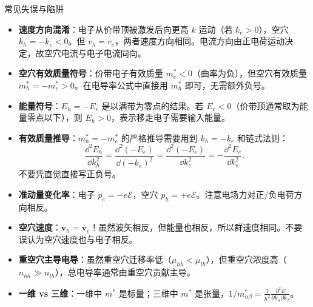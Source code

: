 \begin{errorbox}{常见失误与陷阱}
\begin{itemize}
    \item \textbf{速度方向混淆}：电子从价带顶被激发后向更高 $k$ 运动（若 $k_e>0$），空穴 $k_h=-k_e<0$。但 $v_h=v_e$，两者速度方向相同。电流方向由正电荷运动决定，故空穴电流与电子电流同向。
    \item \textbf{空穴有效质量符号}：价带电子有效质量 $m_e^*<0$（曲率为负），但空穴有效质量 $m_h^*=-m_e^*>0$。在电导率公式中直接用 $m_h^*$ 即可，无需额外负号。
    \item \textbf{能量符号}：$E_h=-E_e$ 是以满带为零点的结果。若 $E_e<0$（价带顶通常取为能量零点以下），则 $E_h>0$，表示移走电子需要输入能量。
    \item \textbf{有效质量推导}：$m_h^*=-m_e^*$ 的严格推导需要用到 $k_h=-k_e$ 和链式法则：
    \[
    \frac{\dd^2E_h}{\dd k_h^2}=\frac{\dd^2(-E_e)}{\dd(-k_e)^2}=\frac{\dd^2(-E_e)}{\dd k_e^2}=-\frac{\dd^2E_e}{\dd k_e^2}.
    \]
    不要凭直觉直接写正负号。
    \item \textbf{准动量变化率}：电子 $\dot{p}_e=-e\mathcal{E}$，空穴 $\dot{p}_h=+e\mathcal{E}$。注意电场力对正/负电荷方向相反。
    \item \textbf{空穴速度}：$\mathbf{v}_h=\mathbf{v}_e$！虽然波矢相反，但能量也相反，所以群速度相同。不要误认为空穴速度也与电子相反。
    \item \textbf{重空穴主导电导}：虽然重空穴迁移率低（$\mu_{hh}<\mu_{lh}$），但重空穴浓度高（$n_{hh}\gg n_{lh}$），总电导率通常由重空穴贡献主导。
    \item \textbf{一维 vs 三维}：一维中 $m^*$ 是标量；三维中 $m^*$ 是张量，$1/m^*_{\alpha\beta}=\frac{1}{\hbar^2}\frac{\partial^2E}{\partial k_\alpha\partial k_\beta}$。
\end{itemize}
\end{errorbox}

